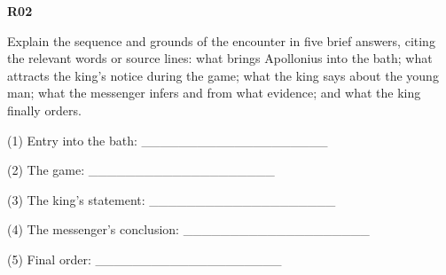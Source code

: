 \par\begin{minipage}{\linewidth}\raggedright
\textbf{R02}

Explain the sequence and grounds of the encounter in five brief answers, citing the relevant words or source lines: what brings Apollonius into the bath; what attracts the king's notice during the game; what the king says about the young man; what the messenger infers and from what evidence; and what the king finally orders.

(1) Entry into the bath: \_\_\_\_\_\_\_\_\_\_\_\_\_\_\_\_\_\_\_\_

(2) The game: \_\_\_\_\_\_\_\_\_\_\_\_\_\_\_\_\_\_\_\_

(3) The king's statement: \_\_\_\_\_\_\_\_\_\_\_\_\_\_\_\_\_\_\_\_

(4) The messenger's conclusion: \_\_\_\_\_\_\_\_\_\_\_\_\_\_\_\_\_\_\_\_

(5) Final order: \_\_\_\_\_\_\_\_\_\_\_\_\_\_\_\_\_\_\_\_

\end{minipage}\par\addvspace{4pt}


